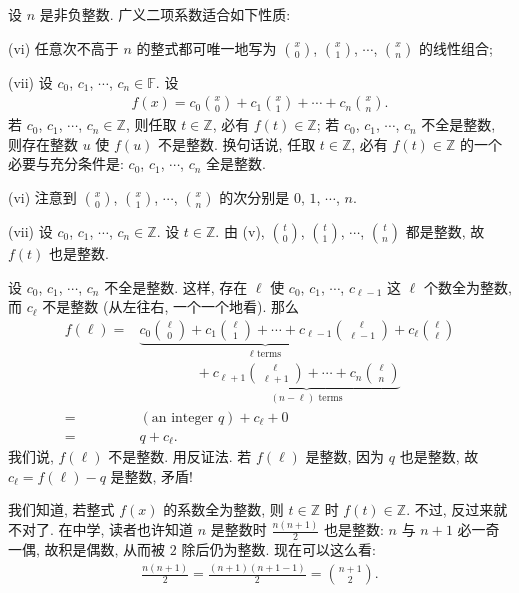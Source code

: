 \begin{proposition}
    设 $n$ 是非负整数. 广义二项系数适合如下性质:

    (vi) 任意次不高于 $n$ 的整式都可唯一地写为 $\binom{x}{0}$, $\binom{x}{1}$, $\cdots$, $\binom{x}{n}$ 的线性组合;

    (vii) 设 $c_0$, $c_1$, $\cdots$, $c_n \in \mathbb{F}$. 设
    \begin{align*}
        f(x) = c_0 \binom{x}{0} + c_1 \binom{x}{1} + \cdots + c_n \binom{x}{n}.
    \end{align*}
    若 $c_0$, $c_1$, $\cdots$, $c_n \in \mathbb{Z}$, 则任取 $t \in \mathbb{Z}$, 必有 $f(t) \in \mathbb{Z}$; 若 $c_0$, $c_1$, $\cdots$, $c_n$ 不全是整数, 则存在整数 $u$ 使 $f(u)$ 不是整数. 换句话说, 任取 $t \in \mathbb{Z}$, 必有 $f(t) \in \mathbb{Z}$ 的一个必要与充分条件是: $c_0$, $c_1$, $\cdots$, $c_n$ 全是整数.
\end{proposition}

\begin{pf}
    (vi) 注意到 $\binom{x}{0}$, $\binom{x}{1}$, $\cdots$, $\binom{x}{n}$ 的次分别是 $0$, $1$, $\cdots$, $n$.

    (vii) 设 $c_0$, $c_1$, $\cdots$, $c_n \in \mathbb{Z}$. 设 $t \in \mathbb{Z}$. 由 (v), $\binom{t}{0}$, $\binom{t}{1}$, $\cdots$, $\binom{t}{n}$ 都是整数, 故 $f(t)$ 也是整数.

    设 $c_0$, $c_1$, $\cdots$, $c_n$ 不全是整数. 这样, 存在 $\ell$ 使 $c_0$, $c_1$, $\cdots$, $c_{\ell - 1}$ 这 $\ell$ 个数全为整数, 而 $c_{\ell}$ 不是整数 (从左往右, 一个一个地看). 那么
    \begin{align*}
        f(\ell)
        = {} & \underbrace{c_0 \binom{\ell}{0} + c_1 \binom{\ell}{1} + \cdots
            + c_{\ell - 1} \binom{\ell}{\ell - 1}}_{\text{$\ell$ terms}}
        {} + c_{\ell} \binom{\ell}{\ell}                                       \\
             & \qquad \qquad + \underbrace{c_{\ell + 1} \binom{\ell}{\ell + 1}
        + \cdots + c_{n} \binom{\ell}{n}}_{\text{$(n - \ell)$ terms}}          \\
        = {} & (\text{an integer $q$}) + c_{\ell} + 0                          \\
        = {} & q + c_{\ell}.
    \end{align*}
    我们说, $f(\ell)$ 不是整数. 用反证法. 若 $f(\ell)$ 是整数, 因为 $q$ 也是整数, 故 $c_{\ell} = f(\ell) - q$ 是整数, 矛盾!
\end{pf}

\begin{example}
    我们知道, 若整式 $f(x)$ 的系数全为整数, 则 $t \in \mathbb{Z}$ 时 $f(t) \in \mathbb{Z}$. 不过, 反过来就不对了. 在中学, 读者也许知道 $n$ 是整数时 $\frac{n(n+1)}{2}$ 也是整数: $n$ 与 $n+1$ 必一奇一偶, 故积是偶数, 从而被 $2$ 除后仍为整数. 现在可以这么看:
    \begin{align*}
        \frac{n(n+1)}{2} = \frac{(n+1)(n+1-1)}{2} = \binom{n+1}{2}.
    \end{align*}
\end{example}

